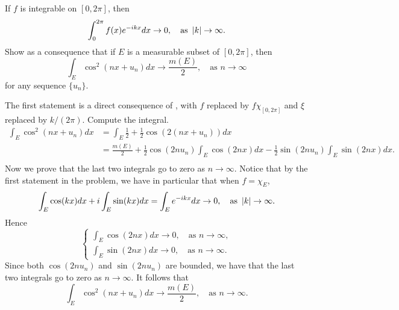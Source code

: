 \begin{problem}
    If $f$ is integrable on $[0,2\pi]$, then 
    \begin{equation*}
        \int_0^{2\pi} f(x)e^{-ikx}dx \to 0, \quad \text{as } \left\lvert {k} \right\rvert\to\infty.
    \end{equation*}
    Show as a consequence that if $E$ is a 
    measurable subset of $[0,2\pi]$, then 
    \begin{equation*}
        \int_E \cos^2(nx + u_n)dx \to \frac{m(E)}{2}, \quad \text{as } n\to\infty
    \end{equation*}
    for any sequence $\{u_n\}$.
\end{problem}
\begin{pf}
    The first statement is a direct consequence of , with $f$ replaced by $f\chi_{[0,2\pi]}$ 
    and $\xi$ replaced by $k/(2\pi)$. Compute the integral. 
    \begin{equation*}
        \begin{split}
            \int_E \cos^2(nx + u_n)dx &= \int_E \frac{1}{2} + \frac{1}{2}\cos(2(nx + u_n))dx \\
            &= \frac{m(E)}{2} + \frac{1}{2}\cos(2nu_n)\int_E \cos(2nx)dx - \frac{1}{2}\sin(2nu_n)\int_E\sin(2nx)dx. \\
        \end{split}
    \end{equation*}
    Now we prove that the last two integrals go to zero as $n\to\infty$. Notice that 
    by the first statement in the problem, we have in particular that when $f = \chi_E$, 
    \begin{equation*}
        \int_E \cos(kx)dx + i\int_E \sin(kx)dx = \int_E e^{-ikx}dx \to 0, \quad \text{as } \left\lvert {k} \right\rvert\to\infty.
    \end{equation*}
    Hence 
    \begin{equation*}
        \begin{cases*}
            \int_E \cos(2nx)dx \to 0, \quad \text{as } n\to\infty, \\
            \int_E \sin(2nx)dx \to 0, \quad \text{as } n\to\infty.
        \end{cases*}
    \end{equation*}
    Since both $\cos(2nu_n)$ and $\sin(2nu_n)$ are bounded, we have that 
    the last two integrals go to zero as $n\to\infty$. It follows that 
    \begin{equation*}
        \int_E \cos^2(nx + u_n)dx \to \frac{m(E)}{2}, \quad \text{as } n\to\infty.
    \end{equation*}
\end{pf}

